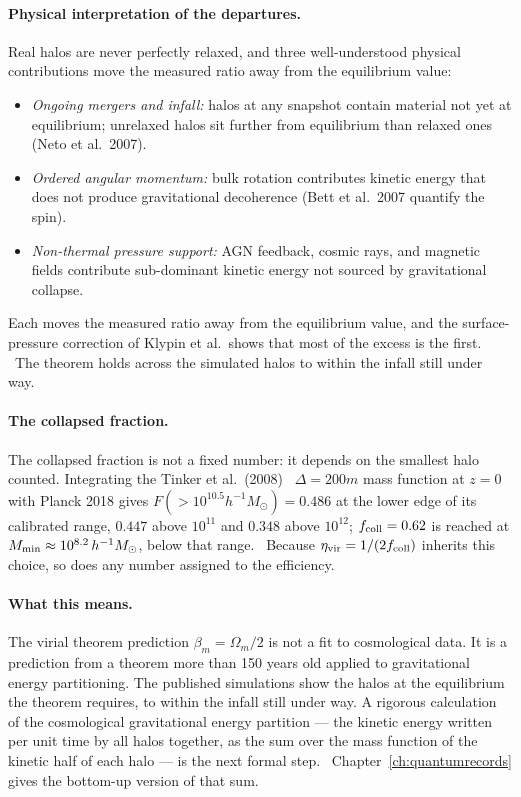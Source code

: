 \paragraph{Physical interpretation of the departures.} Real halos are never perfectly relaxed, and three well-understood physical contributions move the
measured ratio away from the equilibrium value:
\begin{itemize}
\item \emph{Ongoing mergers and infall:} halos at any snapshot contain material not yet at equilibrium; unrelaxed halos sit further from equilibrium than
relaxed ones (Neto et al.\ 2007).
\item \emph{Ordered angular momentum:} bulk rotation contributes kinetic energy that does not produce gravitational decoherence (Bett et al.\ 2007 quantify the
spin).
\item \emph{Non-thermal pressure support:} AGN feedback, cosmic rays, and magnetic fields contribute sub-dominant kinetic energy not sourced by gravitational
collapse.
\end{itemize}
Each moves the measured ratio away from the equilibrium value, and the surface-pressure correction of Klypin et al.\ shows that most of the excess is the
first. \interp\ The theorem holds across the simulated halos to within the infall still under way.

\paragraph{The collapsed fraction.} The collapsed fraction is not a fixed number: it depends on the smallest halo counted. Integrating the Tinker et al.\
(2008)~\cite{Tinker2008} $\Delta=200m$ mass function at $z=0$ with Planck 2018 gives $F(>10^{10.5}h^{-1}M_\odot)=0.486$ at the lower edge of its calibrated
range, $0.447$ above $10^{11}$ and $0.348$ above $10^{12}$; $f_{\rm coll}=0.62$ is reached at $M_{\rm min}\approx10^{8.2}\,h^{-1}M_\odot$, below that
range. \calc\ Because $\eta_{\rm vir}=1/(2f_{\rm coll})$ inherits this choice, so does any number assigned to the efficiency.

\paragraph{What this means.} The virial theorem prediction $\beta_m=\Omega_m/2$ is not a fit to cosmological data. It is a prediction from a theorem more
than 150 years old applied to gravitational energy partitioning. The published simulations show the halos at the equilibrium the theorem
requires, to within the infall still under way. A rigorous calculation of the cosmological gravitational energy partition --- the kinetic energy written
per unit time by all halos together, as the sum over the mass function of the kinetic half of each halo --- is the next formal step.
\openprob\ Chapter~\ref{ch:quantumrecords} gives the bottom-up version of that sum.


